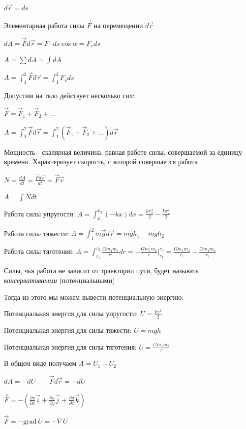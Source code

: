 \documentclass[12pt]{article}
\begin{document}
    $d\vec{r} = ds$

    Элементарная работа силы $\vec{F}$ на перемещении $d\vec{r}$

    $dA = \vec{F} d\vec{r} = F\cdot ds \cos \alpha = F_s ds$

    $A = \sum dA = \int dA$

    $A = \int_1^2 \vec{F}d\vec{r} = \int_1^2 F_s ds$

    Допустим на тело действует несколько сил:

    $\vec{F} = \vec{F}_1 + \vec{F}_2 + \dots$

    $A = \int_1^2 \vec{F}d\vec{r} = \int_1^2 (\vec{F}_1 + \vec{F}_2 + \dots) d\vec{r}$

    Мощность - скалярная величина, равная работе силы, совершаемой за единицу времени. Характеризует скорость, с которой совершается работа

    $N = \frac{dA}{dt} = \frac{\vec{F}d\vec{r}}{dt} = \vec{F}\vec{v}$

    $A = \int Ndt$

    Работа силы упругости: $A = \int_{x_1}^{x_2} (-kx)dx = \frac{kx^2_1}{2} - \frac{kx_2^2}{2}$

    Работа силы тяжести: $A = \int_1^2 m\vec{g}d\vec{r} = mgh_1 - mgh_2$

    Работа силы тяготения: $A = \int_{r_1}^{r_2} \frac{Gm_1 m_2}{r^2} dr = - \frac{Gm_1 m_2}{r} \Big|_{r_1}^{r_2} = \frac{Gm_1 m_2}{r_1} - \frac{Gm_1 m_2}{r_2}$

    Силы, чья работа не зависит от траектории пути, будет называть \textit{консервативными} (потенциальными)

    Тогда из этого мы можем вывести потенциальную энергию:

    Потенциальная энергия для силы упругости: $U = \frac{kx^2}{2}$

    Потенциальная энергия для силы тяжести: $U = mgh$

    Потенциальная энергия для силы тяготения: $U = \frac{Gm_1 m_2}{r}$

    В общем виде получаем $A = U_1 - U_2$

    $dA = -dU \qquad \vec{F}d\vec{r} = -dU$

    $\vec{F} = -(\frac{\partial u}{\partial x}\vec{i} + \frac{\partial u}{\partial y}\vec{j} + \frac{\partial u}{\partial z}\vec{k})$

    $\vec{F} = -\mathrm{grad}\, U = -\nabla U$

\end{document}
